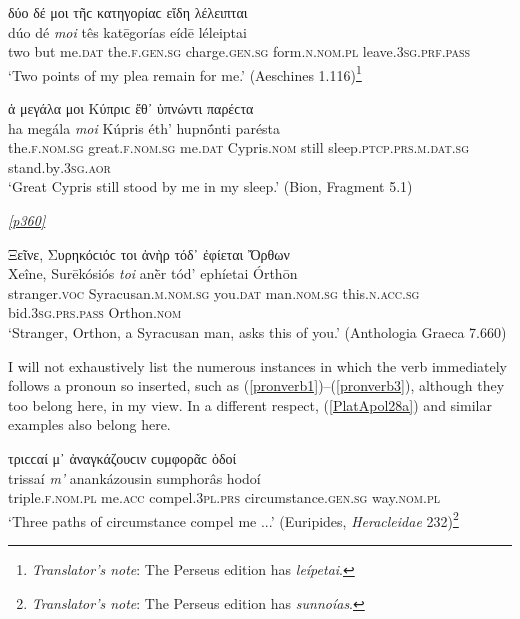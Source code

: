 \begin{exe}
\ex δύο δέ μοι τῆϲ κατηγορίαϲ εἴδη λέλειπται\\
\gll dúo dé \emph{moi} tês katēgorías eídē léleiptai\\
two but me.\textsc{dat} the.\textsc{f.gen.sg} charge.\textsc{gen.sg} form.\textsc{n.nom.pl} leave.\textsc{3sg.prf.pass}\\
\trans `Two points of my plea remain for me.' (Aeschines 1.116)\footnote{\emph{Translator's note}: The Perseus edition has \textit{leípetai}.}
\label{attsep28}
\end{exe}

\begin{exe}
\ex ἁ μεγάλα μοι Κύπριϲ ἔθ᾽ ὑπνώντι παρέϲτα\\
\gll ha megála \emph{moi} Kúpris éth' hupnṓnti parésta\\
the.\textsc{f.nom.sg} great.\textsc{f.nom.sg} me.\textsc{dat}
Cypris.\textsc{nom} still sleep.\textsc{ptcp.prs.m.dat.sg} stand.by\textsc{.3sg.aor}\\
\trans `Great Cypris still stood by me in my sleep.' (Bion, Fragment 5.1)
\label{attsep29}
\end{exe}

\hyperlink{p360}{\emph{[p360]}}

\begin{exe}
\ex Ξεῖνε, Συρηκόϲιόϲ τοι ἀνὴρ τόδ᾽ ἐφίεται Ὄρθων\\
\gll Xeîne, Surēkósiós \emph{toi} anḕr tód' ephíetai Órthōn\\
stranger.\textsc{voc} Syracusan.\textsc{m.nom.sg} you.\textsc{dat} man.\textsc{nom.sg} this.\textsc{n.acc.sg} bid.\textsc{3sg.prs.pass} Orthon.\textsc{nom}\\
\trans `Stranger, Orthon, a Syracusan man, asks this of you.' (Anthologia Graeca 7.660)
\label{attsep30}
\end{exe}

I will not exhaustively list the numerous instances in which the verb immediately follows a pronoun so inserted, such as (\ref{pronverb1})--(\ref{pronverb3}), although they too belong here, in my view. In a different respect, (\ref{PlatApol28a}) and similar examples also belong here.

\begin{exe}
\ex τριϲϲαί μ᾽ ἀναγκάζουϲιν ϲυμφορᾶϲ ὁδοί\\
\gll trissaí \emph{m'} anankázousin sumphorâs hodoí\\
triple.\textsc{f.nom.pl} me.\textsc{acc} compel.\textsc{3pl.prs}
circumstance.\textsc{gen.sg} way.\textsc{nom.pl}\\
\trans `Three paths of circumstance compel me ...' (Euripides, \textit{Heracleidae} 232)\footnote{\emph{Translator's note}: The Perseus edition has \textit{sunnoías}.}
\label{pronverb1}
\end{exe}

